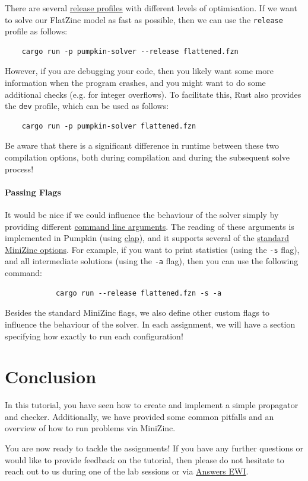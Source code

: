 \documentclass{article}
\begin{document}
        There are several \href{https://doc.rust-lang.org/book/ch14-01-release-profiles.html}{release profiles} with different levels of optimisation.
        If we want to solve our FlatZinc model as fast as possible, then we can use the \texttt{release} profile as follows:
        \begin{verbatim}
    cargo run -p pumpkin-solver --release flattened.fzn
        \end{verbatim}
        However, if you are debugging your code, then you likely want some more information when the program crashes, and you might want to do some additional checks (e.g. for integer overflows).
        To facilitate this, Rust also provides the \texttt{dev} profile, which can be used as follows:
        \begin{verbatim}
    cargo run -p pumpkin-solver flattened.fzn
        \end{verbatim}
        \begin{Note}
            Be aware that there is a significant difference in runtime between these two compilation options, both during compilation and during the subsequent solve process!
        \end{Note}

        \paragraph*{Passing Flags}
            It would be nice if we could influence the behaviour of the solver simply by providing different \href{https://doc.rust-lang.org/book/ch12-01-accepting-command-line-arguments.html}{command line arguments}.
            The reading of these arguments is implemented in Pumpkin (using \href{https://docs.rs/clap/latest/clap/}{clap}), and it supports several of the \href{https://minizinc-doc-test.readthedocs.io/en/stable/fzn-spec.html#command-line-interface-and-standard-options}{standard MiniZinc options}.
            For example, if you want to print statistics (using the \texttt{-s} flag), and all intermediate solutions (using the \texttt{-a} flag), then you can use the following command:
            \begin{verbatim}
            cargo run --release flattened.fzn -s -a
            \end{verbatim}
            Besides the standard MiniZinc flags, we also define other custom flags to influence the behaviour of the solver.
            In each assignment, we will have a section specifying how exactly to run each configuration!

\section{Conclusion}
    In this tutorial, you have seen how to create and implement a simple propagator and checker.
    Additionally, we have provided some common pitfalls and an overview of how to run problems via MiniZinc.
    
    You are now ready to tackle the assignments!
    If you have any further questions or would like to provide feedback on the tutorial, then please do not hesitate to reach out to us during one of the lab sessions or via \href{https://answers.ewi.tudelft.nl/}{Answers EWI}.
\end{document}
